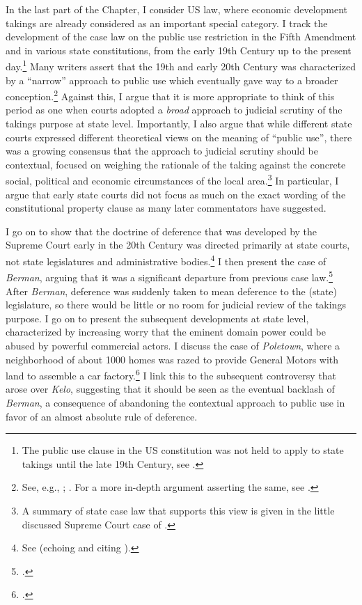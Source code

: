 In the last part of the Chapter, I consider US law, where economic development takings are already considered as an important special category. I track the development of the case law on the public use restriction in the Fifth Amendment and in various state constitutions, from the early 19th Century up to the present day.\footnote{The public use clause in the US constitution was not held to apply to state takings until the late 19th Century, see \cite{chicago97}.} Many writers assert that the 19th and early 20th Century was characterized by a ``narrow'' approach to public use which eventually gave way to a broader conception.\footnote{See, e.g., \cite[483]{walt11}; \cite[203-204]{allen00}. For a more in-depth argument asserting the same, see \cite{nichols40}.} Against this, I argue that it is more appropriate to think of this period as one when courts adopted a {\it broad} approach to judicial scrutiny of the takings purpose at state level. Importantly, I also argue that while different state courts expressed different theoretical views on the meaning of ``public use'', there was a growing consensus that the approach to judicial scrutiny should be contextual, focused on weighing the rationale of the taking against the concrete social, political and economic circumstances of the local area.\footnote{A summary of state case law that supports this view is given in the little discussed Supreme Court case of \cite{hairston08}.}  In particular, I argue that early state courts did not focus as much on the exact wording of the constitutional property clause as many later commentators have suggested.

I go on to show that the doctrine of deference that was developed by the Supreme Court early in the 20th Century was directed primarily at state courts, not state legislatures and administrative bodies.\footnote{See \cite{vester30} (echoing and citing \cite{hairston08}).} I then present the case of {\it Berman}, arguing that it was a significant departure from previous case law.\footcite{berman54} After {\it Berman}, deference was suddenly taken to mean deference to the (state) legislature, so there would be little or no room for judicial review of the takings purpose. I go on to present the subsequent developments at state level, characterized by increasing worry that the eminent domain power could be abused by powerful commercial actors. I discuss the case of {\it Poletown}, where a neighborhood of about 1000 homes was razed to provide General Motors with land to assemble a car factory.\footcite{poletown81} I link this to the subsequent controversy that arose over {\it Kelo}, suggesting that it should be seen as the eventual backlash of {\it Berman}, a consequence of abandoning the contextual approach to public use in favor of an almost absolute rule of deference.


